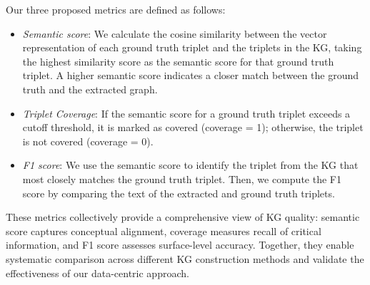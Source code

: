 \documentclass{article} %
\begin{document}

Our three proposed metrics are defined as follows:
\begin{itemize}[noitemsep,leftmargin=*]
\setlength\itemsep{0.01em}
    \item \textit{Semantic score}: We calculate the cosine similarity between the vector representation of each ground truth triplet and the triplets in the KG, taking the highest similarity score as the semantic score for that ground truth triplet. A higher semantic score indicates a closer match between the ground truth and the extracted graph.
    \item \textit{Triplet Coverage}: If the semantic score for a ground truth triplet exceeds a cutoff threshold, it is marked as covered (coverage = 1); otherwise, the triplet is not covered (coverage = 0).
    \item \textit{F1 score}: We use the semantic score to identify the triplet from the KG that most closely matches the ground truth triplet. Then, we compute the F1 score by comparing the text of the extracted and ground truth triplets.
\end{itemize}

These metrics collectively provide a comprehensive view of KG quality: semantic score captures conceptual alignment, coverage measures recall of critical information, and F1 score assesses surface-level accuracy. Together, they enable systematic comparison across different KG construction methods and validate the effectiveness of our data-centric approach.
\end{document}
